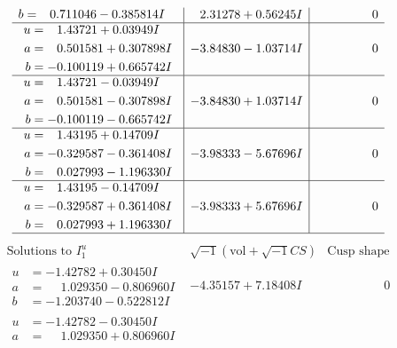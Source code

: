 \documentclass[1p]{elsarticle_modified}
\theoremstyle{definition}
\newcommand{\I}{\sqrt{-1}}
\begin{document}
$$\begin{array}{c|c|c}
\begin{aligned}
b &= \phantom{-}0.711046 - 0.385814 I\end{aligned}
 & \phantom{-}2.31278 + 0.56245 I & \phantom{-0.000000 } 0 \\ \hline\begin{aligned}
u &= \phantom{-}1.43721 + 0.03949 I \\
a &= \phantom{-}0.501581 + 0.307898 I \\
b &= -0.100119 + 0.665742 I\end{aligned}
 & -3.84830 - 1.03714 I & \phantom{-0.000000 } 0 \\ \hline\begin{aligned}
u &= \phantom{-}1.43721 - 0.03949 I \\
a &= \phantom{-}0.501581 - 0.307898 I \\
b &= -0.100119 - 0.665742 I\end{aligned}
 & -3.84830 + 1.03714 I & \phantom{-0.000000 } 0 \\ \hline\begin{aligned}
u &= \phantom{-}1.43195 + 0.14709 I \\
a &= -0.329587 - 0.361408 I \\
b &= \phantom{-}0.027993 - 1.196330 I\end{aligned}
 & -3.98333 - 5.67696 I & \phantom{-0.000000 } 0 \\ \hline\begin{aligned}
u &= \phantom{-}1.43195 - 0.14709 I \\
a &= -0.329587 + 0.361408 I \\
b &= \phantom{-}0.027993 + 1.196330 I\end{aligned}
 & -3.98333 + 5.67696 I & \phantom{-0.000000 } 0\\
 \hline 
 \end{array}$$\newpage$$\begin{array}{c|c|c}  
\text{Solutions to }I^u_{1}& \I (\text{vol} + \sqrt{-1}CS) & \text{Cusp shape}\\
 \hline 
\begin{aligned}
u &= -1.42782 + 0.30450 I \\
a &= \phantom{-}1.029350 - 0.806960 I \\
b &= -1.203740 - 0.522812 I\end{aligned}
 & -4.35157 + 7.18408 I & \phantom{-0.000000 } 0 \\ \hline\begin{aligned}
u &= -1.42782 - 0.30450 I \\
a &= \phantom{-}1.029350 + 0.806960 I \\

\end{aligned}
\end{array}$$
\end{document}
